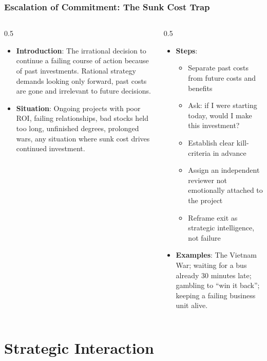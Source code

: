 \begin{frame}[fragile]\frametitle{Escalation of Commitment: The Sunk Cost Trap}
\begin{columns}
    \begin{column}[T]{0.5\linewidth}
      \begin{itemize}
        \item \textbf{Introduction}: The irrational decision to continue a failing course of action because of past investments. Rational strategy demands looking only forward, past costs are gone and irrelevant to future decisions.
        \item \textbf{Situation}: Ongoing projects with poor ROI, failing relationships, bad stocks held too long, unfinished degrees, prolonged wars, any situation where sunk cost drives continued investment.
      \end{itemize}
    \end{column}
    \begin{column}[T]{0.5\linewidth}
      \begin{itemize}
        \item \textbf{Steps}:
        \begin{itemize}
          \item Separate past costs from future costs and benefits
          \item Ask: if I were starting today, would I make this investment?
          \item Establish clear kill-criteria in advance
          \item Assign an independent reviewer not emotionally attached to the project
          \item Reframe exit as strategic intelligence, not failure
        \end{itemize}\item \textbf{Examples}: The Vietnam War; waiting for a bus already 30 minutes late; gambling to ``win it back''; keeping a failing business unit alive.
      \end{itemize}
    \end{column}
  \end{columns}
\end{frame}

\section{Strategic Interaction}

